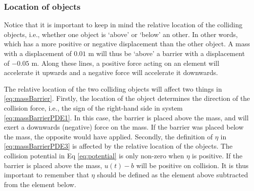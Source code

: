 \subsubsection{Location of objects}
Notice that it is important to keep in mind the relative location of the colliding objects, i.e., whether one object is `above' or `below' an other. In other words, which has a more positive or negative displacement than the other object. A mass with a displacement of $0.01$ m will thus be `above' a barrier with a displacement of $-0.05$ m. Along these lines, a positive force acting on an element will accelerate it upwards and a negative force will accelerate it downwards.

The relative location of the two colliding objects will affect two things in \eqref{eq:massBarrier}.
Firstly, the location of the object determines the direction of the collision force, i.e., the sign of the right-hand side in system \eqref{eq:massBarrierPDE1}. In this case, the barrier is placed above the mass, and will exert a downwards (negative) force on the mass. If the barrier was placed below the mass, the opposite would have applied.
Secondly, the definition of $\eta$ in \eqref{eq:massBarrierPDE3} is affected by the relative location of the objects. The collision potential in Eq \eqref{eq:potential} is only non-zero when $\eta$ is positive. If the barrier is placed above the mass, $u(t)-b$ will be positive on collision. It is thus important to remember that $\eta$ should be defined as the element above subtracted from the element below.

